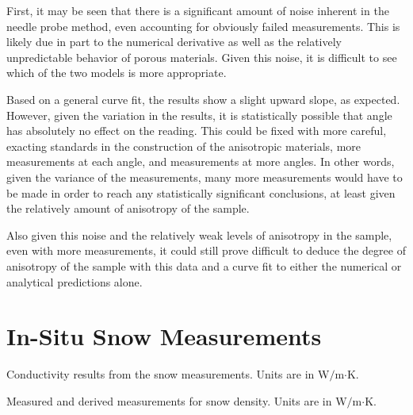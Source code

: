 First, it may be seen that there is a significant amount of noise inherent in
the needle probe method, even accounting for obviously failed measurements.
This is likely due in part to the numerical derivative as well as the relatively
unpredictable behavior of porous materials. Given
this noise, it is difficult to see which of the two models is more appropriate.

Based on a general curve fit, the results show a slight upward slope, as
expected. However, given the variation in the results, it is statistically
possible that angle has absolutely no effect on the reading. This could be fixed
with more careful, exacting standards in the construction of the anisotropic
materials, more measurements at each angle, and measurements at more angles.
In other words, given the variance of the measurements, many more measurements
would have to be made in order to reach any statistically significant
conclusions, at least given the relatively amount of anisotropy of the sample.

Also given this noise and the relatively weak levels of anisotropy in the
sample, even with more measurements, it could still prove difficult to deduce
the degree of anisotropy of the sample with this data and a curve fit to either
the numerical or analytical predictions alone.

\section{In-Situ Snow Measurements}

\begin{table}[h]
\centering

\caption{Conductivity results from the snow measurements. Units are in W\(/\)m\(\cdot\)K.}
\label{tab:snow}
\end{table}

\begin{table}[h]
\centering

\caption{Measured and derived measurements for snow density. Units are in W\(/\)m\(\cdot\)K.}
\label{tab:density}
\end{table}

